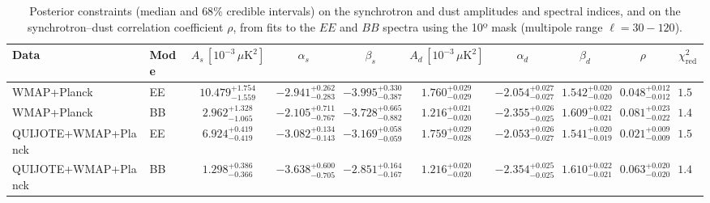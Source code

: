 \begin{table}[h]
\centering
\scriptsize
\setlength{\tabcolsep}{4pt}
\caption{Posterior constraints (median and $68\%$ credible intervals) on the synchrotron and dust amplitudes and spectral indices, and on the synchrotron--dust correlation coefficient $\rho$, from fits to the $EE$ and $BB$ spectra using the 10º mask (multipole range $\ell=30-120$).}
\label{tab:fit_cross_only_ell30-120}
\begin{tabular}{llcccccccc}
\toprule
Data & Mode & $A_s\,[10^{-3}\,\mu\mathrm{K}^2]$ & $\alpha_s$ & $\beta_s$ & $A_d\,[10^{-3}\,\mu\mathrm{K}^2]$ & $\alpha_d$ & $\beta_d$ & $\rho$ & $\chi^2_\mathrm{red}$ \\
\midrule
WMAP+Planck & EE & $10.479^{+1.754}_{-1.559}$ & $-2.941^{+0.262}_{-0.283}$ & $-3.995^{+0.330}_{-0.387}$ & $1.760^{+0.029}_{-0.029}$ & $-2.054^{+0.027}_{-0.027}$ & $1.542^{+0.020}_{-0.020}$ & $0.048^{+0.012}_{-0.012}$ & $1.57$ \\
WMAP+Planck & BB & $2.962^{+1.328}_{-1.065}$ & $-2.105^{+0.711}_{-0.767}$ & $-3.728^{+0.665}_{-0.882}$ & $1.216^{+0.021}_{-0.020}$ & $-2.355^{+0.026}_{-0.025}$ & $1.609^{+0.022}_{-0.021}$ & $0.081^{+0.023}_{-0.022}$ & $1.42$ \\
QUIJOTE+WMAP+Planck & EE & $6.924^{+0.419}_{-0.419}$ & $-3.082^{+0.134}_{-0.143}$ & $-3.169^{+0.058}_{-0.059}$ & $1.759^{+0.029}_{-0.028}$ & $-2.053^{+0.026}_{-0.027}$ & $1.541^{+0.020}_{-0.019}$ & $0.021^{+0.009}_{-0.009}$ & $1.59$ \\
QUIJOTE+WMAP+Planck & BB & $1.298^{+0.386}_{-0.366}$ & $-3.638^{+0.600}_{-0.705}$ & $-2.851^{+0.164}_{-0.167}$ & $1.216^{+0.020}_{-0.020}$ & $-2.354^{+0.025}_{-0.025}$ & $1.610^{+0.022}_{-0.021}$ & $0.063^{+0.020}_{-0.020}$ & $1.43$ \\
\bottomrule
\end{tabular}
\end{table}